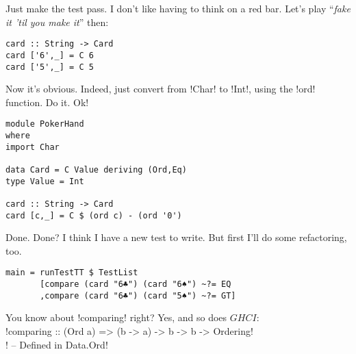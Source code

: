 \lhN \failure Just make the test pass. I don't like having to think on a red bar.
\lhA \failure Let's play ``\emph{fake it 'til you make it}'' then:
\begin{lstlisting}[frame=single]
card :: String -> Card
card ['6',_] = C 6
card ['5',_] = C 5 
\end{lstlisting}
\success Now it's obvious.
\lhN \success Indeed, just convert from \il!Char! to \il!Int!, using the \il!ord! function. Do it.
\lhA \success Ok!
\begin{lstlisting}[frame=single]
module PokerHand
where
import Char

data Card = C Value deriving (Ord,Eq)
type Value = Int

card :: String -> Card
card [c,_] = C $ (ord c) - (ord '0')
\end{lstlisting} %
\success Done.
\lhN Done? I think I have a new test to write. But first I'll do some refactoring, too.
\begin{lstlisting}[frame=single]
main = runTestTT $ TestList 
       [compare (card "6♣") (card "6♠") ~?= EQ
       ,compare (card "6♣") (card "5♠") ~?= GT]
\end{lstlisting} %
You know about \il!comparing! right?
\lhA Yes, and so does $GHCI$: \\

\il!comparing :: (Ord a) => (b -> a) -> b -> b -> Ordering! \\
\il! -- Defined in Data.Ord! \\


